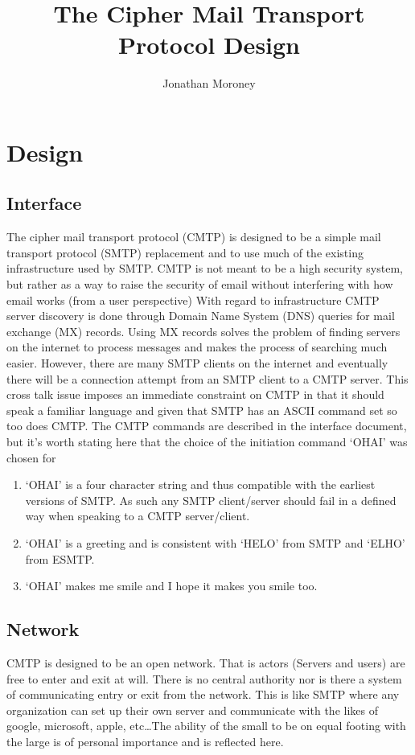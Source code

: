 \documentclass[a4paper,11pt]{article}
\title{The Cipher Mail Transport Protocol Design}
\author{Jonathan Moroney}
\begin{document}
\maketitle
\section{Design}
\subsection{Interface}
The cipher mail transport protocol (CMTP) is designed to be a simple mail transport protocol (SMTP) replacement and to use much of the existing infrastructure used by SMTP. CMTP is not meant to be a high security system, but rather as a way to raise the security of email without interfering with how email works (from a user perspective) With regard to infrastructure CMTP server discovery is done through Domain Name System (DNS) queries for mail exchange (MX) records. Using MX records solves the problem of finding servers on the internet to process messages and makes the process of searching much easier. However, there are many SMTP clients on the internet and eventually there will be a connection attempt from an SMTP client to a CMTP server. This cross talk issue imposes an immediate constraint on CMTP in that it should speak a familiar language and given that SMTP has an ASCII command set so too does CMTP. The CMTP commands are described in the interface document, but it's worth stating here that the choice of the initiation command `OHAI' was chosen for 
\begin{enumerate}
  \item `OHAI' is a four character string and thus compatible with the earliest versions of SMTP. As such any SMTP client/server should fail in a defined way when speaking to a CMTP server/client.
  \item `OHAI' is a greeting and is consistent with `HELO' from SMTP and `ELHO' from ESMTP.
  \item `OHAI' makes me smile and I hope it makes you smile too.
\end{enumerate}
\subsection{Network}
CMTP is designed to be an open network. That is actors (Servers and users) are free to enter and exit at will. There is no central authority nor is there a system of communicating entry or exit from the network. This is like SMTP where any organization can set up their own server and communicate with the likes of google, microsoft, apple, etc\ldots The ability of the small to be on equal footing with the large is of personal importance and is reflected here.
\end{document}
